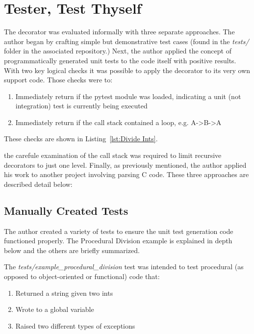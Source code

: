 \section{Tester, Test Thyself}\label{sec:evaluation}

The decorator was evaluated informally with three separate approaches.
The author began by crafting simple but demonstrative test cases 
(found in the \textit{tests/} folder in the associated repository.) Next,
the author applied the concept of programmatically generated unit tests
to the code itself with positive results. With two key logical checks it
was possible to apply the decorator to its very own support code.  Those
checks were to:

\begin{enumerate}
  \item Immediately return if the pytest module was loaded, indicating a unit (not integration) test is currently being executed
  \item Immediately return if the call stack contained a loop, e.g. A->B->A
\end{enumerate}

These checks are shown in Listing~\ref{lst:Divide Ints}.



the carefule examination of the call stack was required to limit 
recursive decorators to just one level. Finally, as previously mentioned, 
the author applied his work to another project involving parsing C code. 
These three approaches are described detail below:

\subsection{Manually Created Tests}\label{sec:eval-1}
The author created a variety of tests to ensure the unit test generation 
code functioned properly. The Procedural Division example is explained in depth
below and the others are briefly summarized.

The \textit{tests/example\_procedural\_division} test was intended 
to test procedural (as opposed to object-oriented or functional) code that:  

\begin{enumerate}
    \item Returned a string given two ints
    \item Wrote to a global variable
    \item Raised two different types of exceptions
\end{enumerate}


